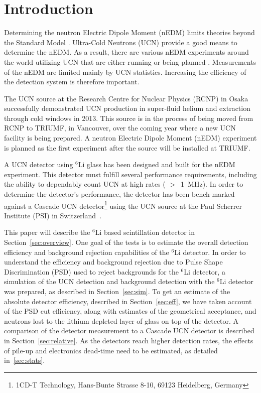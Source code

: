 \documentclass[letter,twocolumn,preprint,3p,numbers,sort&compress]{elsarticle}
\begin{document}
\linenumbers


\section{Introduction}

Determining the neutron Electric Dipole Moment (nEDM) limits theories
beyond the Standard Model \cite{pospelov}.  Ultra-Cold Neutrons (UCN)
provide a good means to determine the nEDM.  As a result, there are
various nEDM experiments around the world utilizing UCN that are
either running or being planned
\cite{fillipone,PSI,Gatchina,APSerebov,KKirch,CABaker,YMasuda,IAltarev,RGolub,SNS}.
Measurements of the nEDM are limited mainly by UCN statistics.
Increasing the efficiency of the detection system is therefore
important.

The UCN source at the Research Centre for Nuclear Physics (RCNP) in
Osaka successfully demonstrated UCN production in super-fluid helium
and extraction through cold windows in 2013\cite{kawasaki2014}.  This
source is in the process of being moved from RCNP to TRIUMF, in
Vancouver, over the coming year where a new UCN facility is being
prepared.  A neutron Electric Dipole Moment (nEDM) experiment is
planned as the first experiment after the source will be installed at
TRIUMF\cite{jeffucn}.

A UCN detector using $^6$Li glass has been designed and built for the
nEDM experiment.  This detector must fulfill several performance
requirements, including the ability to dependably count UCN at high
rates ( $>$~1~MHz).  In order to determine the detector's performance,
the detector has been bench-marked against a Cascade UCN
detector\footnote{1CD-T Technology, Hans-Bunte Strasse 8-10, 69123
  Heidelberg, Germany} using the UCN source at the Paul Scherrer
Institute (PSI) in Switzerland~\cite{BLaussAIP2012, BLaussHFI2012,
  BLaussPP2014}.

This paper will describe the $^{6}$Li based scintillation detector in
Section~\ref{sec:overview}.  One goal of the tests is to estimate the
overall detection efficiency and background rejection capabilities of
the $^{6}$Li detector.  In order to understand the efficiency and
background rejection due to Pulse Shape Discrimination (PSD) used to
reject backgrounds for the $^{6}$Li detector, a simulation of the UCN
detection and background detection with the $^{6}$Li detector was
prepared, as described in Section~\ref{sec:sim}.  To get an estimate
of the absolute detector efficiency, described in
Section~\ref{sec:eff}, we have taken account of the PSD cut
efficiency, along with estimates of the geometrical acceptance, and
neutrons lost to the lithium depleted layer of glass on top of the
detector.  A comparison of the detector measurement to a Cascade UCN
detector is described in Section~\ref{sec:relative}.  As the detectors
reach higher detection rates, the effects of pile-up and electronics
dead-time need to be estimated, as detailed in~\ref{sec:stats}.
\end{document}
